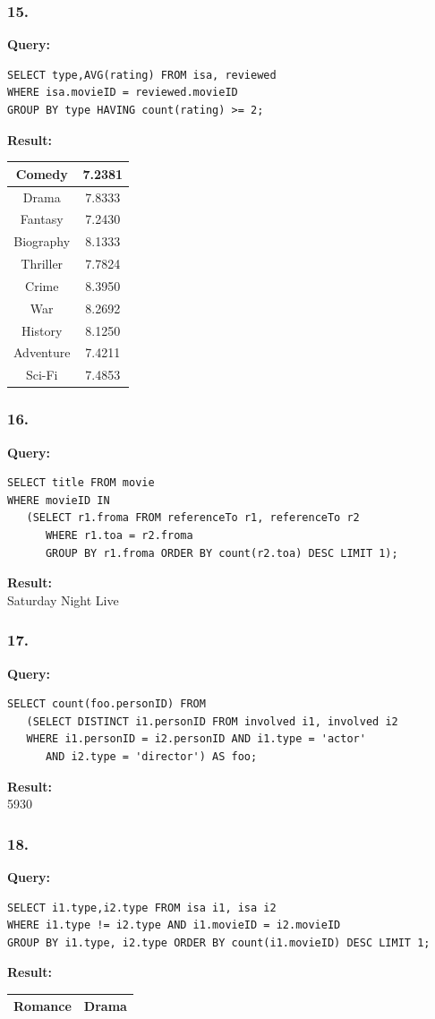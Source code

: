 \documentclass[10pt,a4paper,final]{report}
\begin{document}
\subsubsection*{15.}
\textbf{Query:}
\begin{lstlisting}
SELECT type,AVG(rating) FROM isa, reviewed 
WHERE isa.movieID = reviewed.movieID 
GROUP BY type HAVING count(rating) >= 2;
\end{lstlisting}
\textbf{Result:}

\begin{tabular}{|c|c|}
\hline Comedy & 7.2381 \\ 
\hline Drama & 7.8333 \\ 
\hline Fantasy & 7.2430 \\ 
\hline Biography & 8.1333 \\ 
\hline Thriller & 7.7824 \\ 
\hline Crime & 8.3950 \\ 
\hline War & 8.2692 \\ 
\hline History & 8.1250 \\ 
\hline Adventure & 7.4211 \\ 
\hline Sci-Fi & 7.4853 \\ 
\hline 
\end{tabular}
\subsubsection*{16.}
\textbf{Query:}
\begin{lstlisting}
SELECT title FROM movie 
WHERE movieID IN 
   (SELECT r1.froma FROM referenceTo r1, referenceTo r2
      WHERE r1.toa = r2.froma 
      GROUP BY r1.froma ORDER BY count(r2.toa) DESC LIMIT 1);
\end{lstlisting}
\textbf{Result:}\\
Saturday Night Live
\subsubsection*{17.}
\textbf{Query:}
\begin{lstlisting}
SELECT count(foo.personID) FROM 
   (SELECT DISTINCT i1.personID FROM involved i1, involved i2 
   WHERE i1.personID = i2.personID AND i1.type = 'actor' 
      AND i2.type = 'director') AS foo;
\end{lstlisting}
\textbf{Result:}\\
5930
\subsubsection*{18.}
\textbf{Query:}
\begin{lstlisting}
SELECT i1.type,i2.type FROM isa i1, isa i2 
WHERE i1.type != i2.type AND i1.movieID = i2.movieID 
GROUP BY i1.type, i2.type ORDER BY count(i1.movieID) DESC LIMIT 1;
\end{lstlisting}
\textbf{Result:}

\begin{tabular}{|c|c|}
\hline 
Romance & Drama \\ 
\hline 
\end{tabular} 
\end{document}
